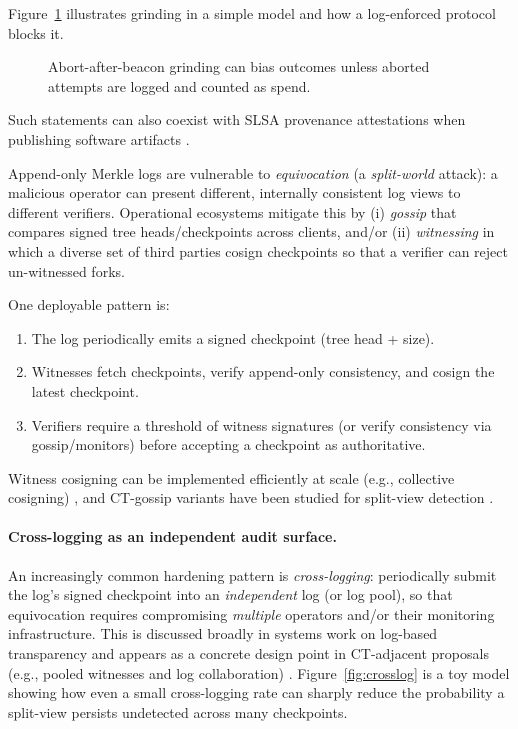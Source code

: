 \documentclass[11pt]{article}
\begin{document}
Figure~\ref{fig:abort} illustrates grinding in a simple model and how a log-enforced protocol blocks it.

\begin{figure}[t]
\centering
{}
\caption{Abort-after-beacon grinding can bias outcomes unless aborted attempts are logged and counted as spend.}
\label{fig:abort}
\end{figure}

Such statements can also coexist with SLSA provenance attestations when publishing software artifacts \cite{slsa_provenance_v1}.

Append-only Merkle logs are vulnerable to \emph{equivocation} (a \emph{split-world} attack): a malicious operator can present different, internally consistent log views to different verifiers.
Operational ecosystems mitigate this by (i) \emph{gossip} that compares signed tree heads/checkpoints across clients, and/or
(ii) \emph{witnessing} in which a diverse set of third parties cosign checkpoints so that a verifier can reject un-witnessed forks.

One deployable pattern is:
\begin{enumerate}
\item The log periodically emits a signed checkpoint (tree head + size).
\item Witnesses fetch checkpoints, verify append-only consistency, and cosign the latest checkpoint.
\item Verifiers require a threshold of witness signatures (or verify consistency via gossip/monitors) before accepting a checkpoint as authoritative.
\end{enumerate}
Witness cosigning can be implemented efficiently at scale (e.g., collective cosigning) \cite{syta2016cosi}, and CT-gossip variants have been studied for split-view detection \cite{dahlberg2018ctgossip}.

\paragraph{Cross-logging as an independent audit surface.}
An increasingly common hardening pattern is \emph{cross-logging}: periodically submit the log's signed checkpoint into an \emph{independent} log (or log pool), so that equivocation requires compromising \emph{multiple} operators and/or their monitoring infrastructure.
This is discussed broadly in systems work on log-based transparency \cite{hicks2023sok_transparency} and appears as a concrete design point in CT-adjacent proposals (e.g., pooled witnesses and log collaboration) \cite{dirksen2021logpicker}.
Figure~\ref{fig:crosslog} is a toy model showing how even a small cross-logging rate can sharply reduce the probability a split-view persists undetected across many checkpoints.
\end{document}
